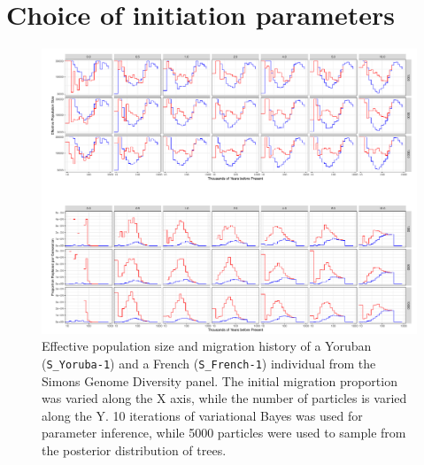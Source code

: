 \documentclass{article}
\begin{document}
\section{Choice of initiation parameters} \label{minit}

\begin{figure}
	\centering
	\includegraphics[width=\textwidth]{../plot/mig/yri_dif_migs.pdf}
	\caption{Effective population size and migration history of a Yoruban ({\tt S\_Yoruba-1}) and a French ({\tt S\_French-1}) individual from the Simons Genome Diversity panel. The initial migration proportion was varied along the X axis, while the number of particles is varied along the Y. 10 iterations of variational Bayes was used for parameter inference, while 5000 particles were used to sample from the posterior distribution of trees.}
	\label{init_yri}
\end{figure}



\end{document}
